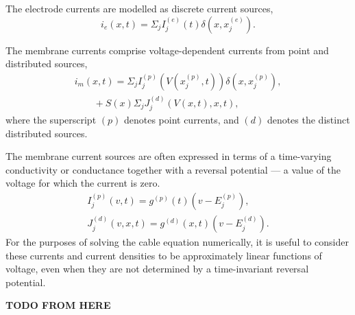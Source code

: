 The electrode currents are modelled as discrete current sources,
\begin{equation}
    i_e(x, t) = \Sigma_j I^{(e)}_j(t) \delta(x, x^{(e)}_j).
\end{equation}

The membrane currents comprise voltage-dependent currents from point and distributed sources,
\begin{equation}
\begin{split}
    i_m(x, t) = \Sigma_j I^{(p)}_j(V(x^{(p)}_j, t)) \delta(x, x^{(p)}_j), \\
\qquad
    + S(x) \Sigma_j J^{(d)}_j(V(x, t), x, t),
\end{split}
\end{equation}
where the superscript $(p)$ denotes point currents, and $(d)$ denotes the distinct distributed sources.

The membrane current sources are often expressed in terms of a time-varying conductivity or conductance
together with a reversal potential --- a value of the voltage for which the current is zero.
\begin{gather}
    I^{(p)}_j(v, t) = g^{(p)}(t)(v - E^{(p)}_j), \\
    J^{(d)}_j(v, x, t) = g^{(d)}(x, t)(v - E^{(d)}_j).
\end{gather}
For the purposes of solving the cable equation numerically, it is useful to consider these currents
and current densities to be approximately linear functions of voltage, even when they are not
determined by a time-invariant reversal potential.

\textbf{TODO FROM HERE}

